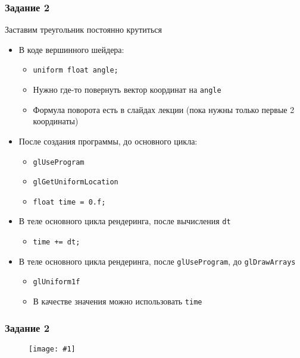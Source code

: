 \documentclass{beamer}
\newcommand{\slideimage}[1]{
  \begin{figure}
    \begin{adjustbox}{width=\textwidth, totalheight=\textheight-2\baselineskip-2\baselineskip,keepaspectratio}
      \texttt{[image: \#1]}
    \end{adjustbox}
  \end{figure}
}
\begin{document}
\begin{frame}[fragile]
\frametitle{Задание 2}
Заставим треугольник постоянно крутиться
\begin{itemize}
\pause
\item В коде вершинного шейдера:
\begin{itemize}
\item \verb|uniform float angle;|
\pause
\item Нужно где-то повернуть вектор координат на \verb|angle|
\item Формула поворота есть в слайдах лекции (пока нужны только первые 2 координаты)
\end{itemize}
\pause
\item После создания программы, до основного цикла:
\begin{itemize}
\item \verb|glUseProgram|
\item \verb|glGetUniformLocation|
\item \verb|float time = 0.f;|
\end{itemize}
\pause
\item В теле основного цикла рендеринга, после вычисления \verb|dt|
\begin{itemize}
\item \verb|time += dt;|
\end{itemize}
\item В теле основного цикла рендеринга, после \verb|glUseProgram|, до \verb|glDrawArrays|
\begin{itemize}
\item \verb|glUniform1f|
\item В качестве значения можно использовать \verb|time|
\end{itemize}
\end{itemize}
\end{frame}

\begin{frame}
\frametitle{Задание 2}
\slideimage{2.png}
\end{frame}
\end{document}

